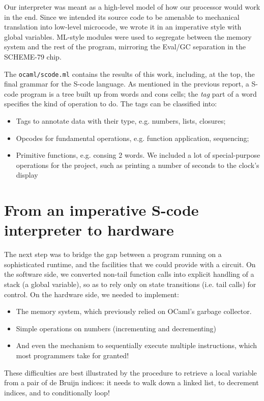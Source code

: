 \documentclass[a4paper, 11pt]{article}
\begin{document}
Our interpreter was meant as a high-level model of how our processor would work in the end. Since  we intended its source code to be amenable to mechanical translation into low-level microcode, we wrote it in an imperative style with global variables. ML-style modules were used to segregate between the memory system and the rest of the program, mirroring the Eval/GC separation in the SCHEME-79 chip.

The \texttt{ocaml/scode.ml} contains the results of this work, including, at the top, the final grammar for the S-code language. As mentioned in the previous report, a S-code program is a tree built up from words and cons cells; the \emph{tag} part of a word specifies the kind of operation to do. The tags can be classified into:
\begin{itemize}
\item Tags to annotate data with their type, e.g. numbers, lists, closures;
\item Opcodes for fundamental operations, e.g. function application, sequencing;
\item Primitive functions, e.g. consing 2 words. We included a lot of special-purpose operations for the project, such as printing a number of seconds to the clock's display
\end{itemize}

\section{From an imperative S-code interpreter to hardware}

The next step was to bridge the gap between a program running on a sophisticated runtime, and the facilities that we could provide with a circuit. On the software side, we converted non-tail function calls into explicit handling of a stack (a global variable), so as to rely only on state transitions (i.e. tail calls) for control. On the hardware side, we needed to implement:
\begin{itemize}
\item The memory system, which previously relied on OCaml's garbage collector.
\item Simple operations on numbers (incrementing and decrementing)
\item And even the mechanism to sequentially execute multiple instructions, which most programmers take for granted!
\end{itemize}
These difficulties are best illustrated by the procedure to retrieve a local variable from a pair of de Bruijn indices: it needs to walk down a linked list, to decrement indices, and to conditionally loop!
\end{document}
